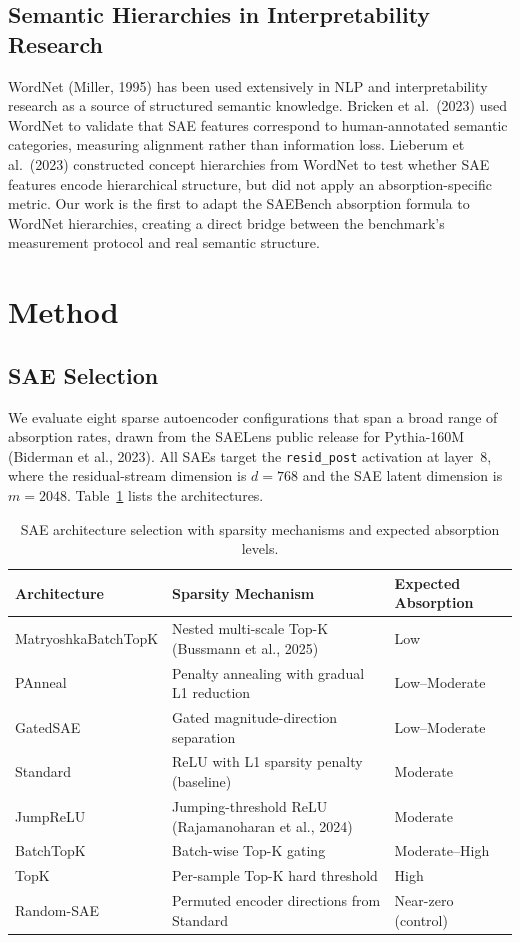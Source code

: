 \documentclass{article}
\begin{document}
\subsection{Semantic Hierarchies in Interpretability Research}

WordNet (Miller, 1995) has been used extensively in NLP and interpretability research as a source of structured semantic knowledge. Bricken et al.~(2023) used WordNet to validate that SAE features correspond to human-annotated semantic categories, measuring alignment rather than information loss. Lieberum et al.~(2023) constructed concept hierarchies from WordNet to test whether SAE features encode hierarchical structure, but did not apply an absorption-specific metric. Our work is the first to adapt the SAEBench absorption formula to WordNet hierarchies, creating a direct bridge between the benchmark's measurement protocol and real semantic structure.

\section{Method}
\label{sec:method}

\subsection{SAE Selection}

We evaluate eight sparse autoencoder configurations that span a broad range of absorption rates, drawn from the SAELens public release for Pythia-160M (Biderman et al., 2023). All SAEs target the \texttt{resid\_post} activation at layer~8, where the residual-stream dimension is $d = 768$ and the SAE latent dimension is $m = 2048$. Table~\ref{tab:architectures} lists the architectures.

\begin{table}[t]
\caption{SAE architecture selection with sparsity mechanisms and expected absorption levels.}
\label{tab:architectures}
\centering
\begin{tabular}{lll}
\toprule
Architecture & Sparsity Mechanism & Expected Absorption \\
\midrule
MatryoshkaBatchTopK & Nested multi-scale Top-K (Bussmann et al., 2025) & Low \\
PAnneal & Penalty annealing with gradual L1 reduction & Low--Moderate \\
GatedSAE & Gated magnitude-direction separation & Low--Moderate \\
Standard & ReLU with L1 sparsity penalty (baseline) & Moderate \\
JumpReLU & Jumping-threshold ReLU (Rajamanoharan et al., 2024) & Moderate \\
BatchTopK & Batch-wise Top-K gating & Moderate--High \\
TopK & Per-sample Top-K hard threshold & High \\
Random-SAE & Permuted encoder directions from Standard & Near-zero (control) \\
\bottomrule
\end{tabular}
\end{table}
\end{document}
